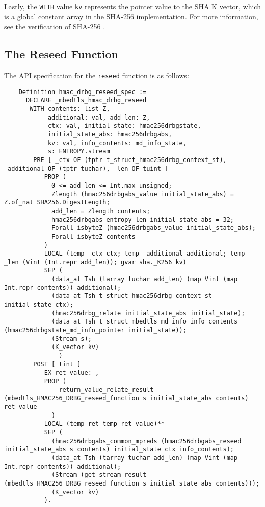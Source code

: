 \documentclass[pageno]{jpaper}
\begin{document}
Lastly, the \lstinline{WITH} value \lstinline{kv} represents the pointer value to the SHA K vector, which is a global constant array in the SHA-256 implementation. For more information, see the verification of SHA-256 \cite{sha}.

\subsection{The Reseed Function}

The API specification for the \lstinline{reseed} function is as follows:

\begin{lstlisting}
    Definition hmac_drbg_reseed_spec :=
      DECLARE _mbedtls_hmac_drbg_reseed
       WITH contents: list Z,
            additional: val, add_len: Z,
            ctx: val, initial_state: hmac256drbgstate,
            initial_state_abs: hmac256drbgabs,
            kv: val, info_contents: md_info_state,
            s: ENTROPY.stream
        PRE [ _ctx OF (tptr t_struct_hmac256drbg_context_st), _additional OF (tptr tuchar), _len OF tuint ]
           PROP (
             0 <= add_len <= Int.max_unsigned;
             Zlength (hmac256drbgabs_value initial_state_abs) = Z.of_nat SHA256.DigestLength;
             add_len = Zlength contents;
             hmac256drbgabs_entropy_len initial_state_abs = 32;
             Forall isbyteZ (hmac256drbgabs_value initial_state_abs);
             Forall isbyteZ contents
           )
           LOCAL (temp _ctx ctx; temp _additional additional; temp _len (Vint (Int.repr add_len)); gvar sha._K256 kv)
           SEP (
             (data_at Tsh (tarray tuchar add_len) (map Vint (map Int.repr contents)) additional);
             (data_at Tsh t_struct_hmac256drbg_context_st initial_state ctx);
             (hmac256drbg_relate initial_state_abs initial_state);
             (data_at Tsh t_struct_mbedtls_md_info info_contents (hmac256drbgstate_md_info_pointer initial_state));
             (Stream s);
             (K_vector kv)
               )
        POST [ tint ]
           EX ret_value:_,
           PROP (
               return_value_relate_result (mbedtls_HMAC256_DRBG_reseed_function s initial_state_abs contents) ret_value
             )
           LOCAL (temp ret_temp ret_value)**
           SEP (
             (hmac256drbgabs_common_mpreds (hmac256drbgabs_reseed initial_state_abs s contents) initial_state ctx info_contents);
             (data_at Tsh (tarray tuchar add_len) (map Vint (map Int.repr contents)) additional);
             (Stream (get_stream_result (mbedtls_HMAC256_DRBG_reseed_function s initial_state_abs contents)));
             (K_vector kv)
           ).
\end{lstlisting}
\end{document}

